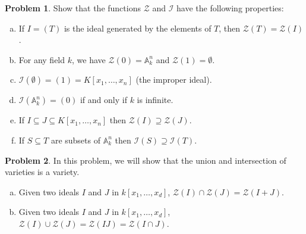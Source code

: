 \documentclass[11pt]{article}
\theoremstyle{definition}
\newtheorem{problem}{Problem}
\begin{document}
\begin{problem}
Show that the functions $\mathcal{Z}$ and $\mathcal{I}$ have the following properties:
\begin{enumerate}[a)]
\item If $I=(T)$ is the ideal generated by the elements of $T$, then $\mathcal{Z}(T) = \mathcal{Z}(I)$.
\item For any field $k$, we have $\mathcal{Z}(0) = \mathbb{A}^n_k$ and $\mathcal{Z}(1) = \emptyset$. 
\item $\mathcal{I}(\emptyset)  = (1)= K[x_1, \dots, x_n]$ (the improper ideal).
\item $\mathcal{I}(\mathbb{A}^n_k) = (0)$ if and only if $k$ is infinite.
\item If $I \subseteq J\subseteq K[x_1,\ldots, x_n]$ then $\mathcal{Z}(I) \supseteq \mathcal{Z}(J)$.
\item If $S \subseteq T$ are subsets of $\mathbb{A}_k^n$ then $\mathcal{I}(S) \supseteq \mathcal{I}(T)$.
\end{enumerate}
\end{problem}

\begin{problem} In this problem, we will show that the union and intersection of varieties is a variety.
\begin{enumerate}[a)]
	\item Given two ideals $I$ and $J$ in $k[x_1, \ldots, x_d]$, $\mathcal{Z}(I) \cap \mathcal{Z}(J) = \mathcal{Z}(I + J)$.
	\item Given two ideals $I$ and $J$ in $k[x_1, \ldots, x_d]$, $\mathcal{Z}(I) \cup \mathcal{Z}(J) = \mathcal{Z}(IJ) = \mathcal{Z}(I \cap J)$.
\end{enumerate}
\end{problem}
\end{document}
